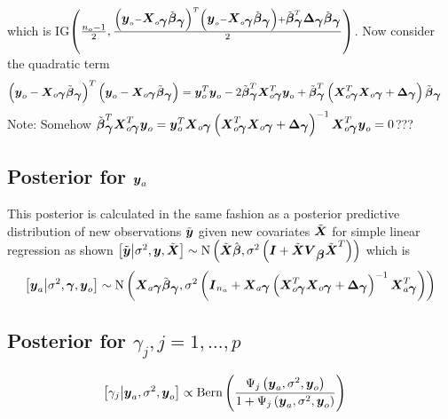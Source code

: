 \documentclass[fleqn]{article}
\def\bm#1{\mbox{\boldmath $#1$}}
\begin{document}
%
which is IG$\left( \frac{n_o - 1} {2}, \frac{ \left( \bm{y}_o - \bm{X}_{o \bm{\gamma}} \tilde{\bm{\beta}}_{\bm{\gamma}} \right)^T \left( \bm{y}_o - \bm{X}_{o \bm{\gamma}} \tilde{\bm{\beta}}_{\bm{\gamma}} \right) + \tilde{\bm{\beta}}_{\bm{\gamma}}^T \bm{\Delta}_{\bm{\gamma}} \tilde{\bm{\beta}}_{\bm{\gamma}} } {2} \right)$. Now consider the quadratic term 
%
\begin{align*}
%
\left( \bm{y}_o - \bm{X}_{o \bm{\gamma}} \tilde{\bm{\beta}}_{\bm{\gamma}} \right)^T \left( \bm{y}_o - \bm{X}_{o \bm{\gamma}} \tilde{\bm{\beta}}_{\bm{\gamma}} \right) & = \bm{y}_o^T \bm{y}_o - 2 \tilde{\bm{\beta}}_{\bm{\gamma}}^T \bm{X}_{o \bm{\gamma}}^T \bm{y}_o + \tilde{\bm{\beta}}_{\bm{\gamma}}^T \left( \bm{X}_{o \bm{\gamma}}^T \bm{X}_{o \bm{\gamma}} + \bm{\Delta}_{\bm{\gamma}} \right) \tilde{\bm{\beta}}_{\bm{\gamma}}
%
\end{align*}
%
Note: Somehow $\tilde{\bm{\beta}}_{\bm{\gamma}}^T \bm{X}_{o \bm{\gamma}}^T \bm{y}_o = \bm{y}_o^T \bm{X}_{o \bm{\gamma}} \left( \bm{X}_{ o \bm{\gamma}}^T \bm{X}_{o \bm{\gamma}} + \bm{\Delta}_{\bm{\gamma}} \right)^{ - 1} \bm{X}_{o \bm{\gamma}}^T \bm{y}_o = 0$???
\subsection{Posterior for $\bm{y}_a$}
%
This posterior is calculated in the same fashion as a posterior predictive distribution of new observations $\tilde{\bm{y}}$ given new covariates $\tilde{\bm{X}}$ for simple linear regression as shown $\left[ \tilde{\bm{y}} \middle| \sigma^2, \bm{y}, \tilde{\bm{X}} \right] \sim \mbox{N}\left( \tilde{\bm{X}} \hat{\bm{\beta}}, \sigma^2 \left( \bm{I} + \tilde{\bm{X}} \bm{V}_{\bm{\beta}} \tilde{\bm{X}}^T \right) \right)
$
which is  
%
\begin{align*}
%
\left[ \bm{y}_a \middle| \sigma^2, \bm{\gamma}, \bm{y}_o \right] \sim \mbox{N}\left( \bm{X}_{a \bm{\gamma}} \tilde{\bm{\beta}}_{\bm{\gamma}}, \sigma^2 \left( \bm{I}_{n_a} + \bm{X}_{a \bm{\gamma}} \left( \bm{X}_{o \bm{\gamma}}^T \bm{X}_{o \bm{\gamma}} + \bm{\Delta}_{\bm{\gamma}} \right)^{ - 1} \bm{X}_{a \bm{\gamma}}^T \right) \right)
%
\end{align*}
\subsection{Posterior for $\gamma_j, j = 1, \ldots, p$}
%
\begin{align*}
%
\left[ \gamma_j \middle| \bm{y}_a, \sigma^2, \bm{y}_o \right] & \propto \mbox{Bern} \left( \frac{\Psi_j \left( \bm{y}_a, \sigma^2, \bm{y}_o \right)} {1 + \Psi_j \left( \bm{y}_a, \sigma^2, \bm{y}_o \right)} \right)
%
\end{align*}
\end{document}
